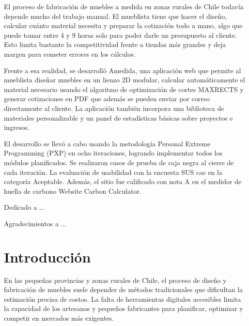 ﻿\documentclass{iccmemoria}
\author{ANGEL NICOLÁS BRAVO MUÑOZ}
\date{SEPTIEMBRE 2025}
\begin{document}
\maketitle

\begin{resumen}
El proceso de fabricación de muebles a medida en zonas rurales de Chile todavía depende mucho del trabajo manual. El mueblista tiene que hacer el diseño, calcular cuánto material necesita y preparar la cotización todo a mano, algo que puede tomar entre 4 y 9 horas solo para poder darle un presupuesto al cliente. Esto limita bastante la competitividad frente a tiendas más grandes y deja margen para cometer errores en los cálculos.

Frente a esa realidad, se desarrolló Amedida, una aplicación web que permite al mueblista diseñar muebles en un lienzo 2D modular, calcular automáticamente el material necesario usando el algoritmo de optimización de cortes MAXRECTS y generar cotizaciones en PDF que además se pueden enviar por correo directamente al cliente. La aplicación también incorpora una biblioteca de materiales personalizable y un panel de estadísticas básicas sobre proyectos e ingresos.

El desarrollo se llevó a cabo usando la metodología Personal Extreme Programming (PXP) en ocho iteraciones, logrando implementar todos los módulos planificados. Se realizaron casos de prueba de caja negra al cierre de cada iteración. La evaluación de usabilidad con la encuesta SUS cae en la categoría Aceptable. Además, el sitio fue calificado con nota A en el medidor de huella de carbono Website Carbon Calculator.

\end{resumen}

\begin{dedicatory}
Dedicado a ...
\end{dedicatory}

\begin{acknowledgment}
Agradecimientos a ...
\end{acknowledgment}

\tableofcontents
\listoffigures
\listoftables

\chapter{Introducción}
\onehalfspacing
\begingroup
\noindent En las pequeñas provincias y zonas rurales de Chile, el proceso de diseño y fabricación de muebles suele depender de métodos tradicionales que dificultan la estimación precisa de costos. La falta de herramientas digitales accesibles limita la capacidad de los artesanos y pequeños fabricantes para planificar, optimizar y competir en mercados más exigentes.\\
\end{document}
